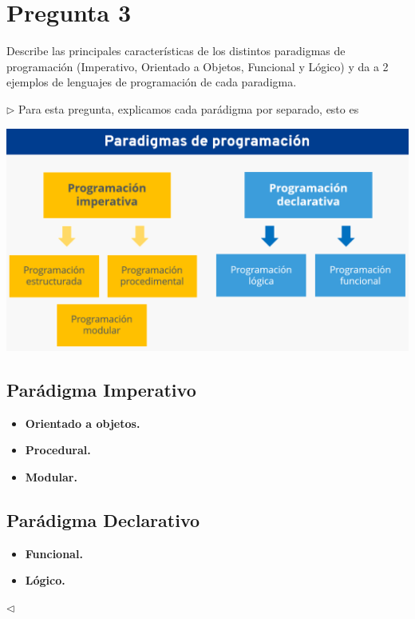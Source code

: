 \newpage
\section*{Pregunta 3}
Describe las principales características de los distintos paradigmas
de programación (Imperativo, Orientado a Objetos, Funcional y Lógico)
y da a 2 ejemplos de lenguajes de programación de cada paradigma.

$\rhd$ Para esta pregunta, explicamos cada parádigma por separado,
esto es
\begin{center}
  \includegraphics[scale=0.20]{./Paradigmas.png}
\end{center}
\subsection*{Parádigma Imperativo}
\begin{itemize}
\item \textbf{Orientado a objetos.} 
\item \textbf{Procedural.}
\item \textbf{Modular.}
\end{itemize}
\subsection*{Parádigma Declarativo}
\begin{itemize}
\item \textbf{Funcional.}
\item \textbf{Lógico.}
\end{itemize}
\hfill $\lhd$
